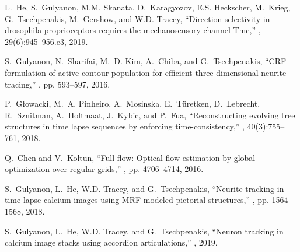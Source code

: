 \documentclass{article}
\begin{document}

\small{
%
\begin{thebibliography}{10}
	
	L.~He, S.~Gulyanon, M.M. Skanata, D.~Karagyozov, E.S. Heckscher, M.~Krieg,
	G.~Tsechpenakis, M.~Gershow, and W.D. Tracey,
	\newblock ``Direction selectivity in drosophila proprioceptors requires the
	mechanosensory channel {Tmc},''
	, 29(6):945--956.e3, 2019.
	
	
	S.~Gulyanon, N.~Sharifai, M.~D. Kim, A.~Chiba, and G.~Tsechpenakis,
	\newblock ``{CRF} formulation of active contour population for efficient three-dimensional neurite tracing,''
	, pp. 593--597, 2016.
	
	P.~{Głowacki}, M.~A. {Pinheiro}, A.~{Mosinska}, E.~{Türetken}, D.~{Lebrecht},
	R.~{Sznitman}, A.~{Holtmaat}, J.~{Kybic}, and P.~{Fua},
	\newblock ``Reconstructing evolving tree structures in time lapse sequences by
	enforcing time-consistency,''
	, 40(3):755--761, 2018.
	
	Q.~Chen and V.~Koltun,
	\newblock ``Full flow: Optical flow estimation by global optimization over
	regular grids,''
	, pp. 4706--4714, 2016.
	
	
	S.~Gulyanon, L.~He, W.D. Tracey, and G.~Tsechpenakis,
	\newblock ``Neurite tracking in time-lapse calcium images using {MRF}-modeled
	pictorial structures,''
	, pp. 1564--1568, 2018.
	
	S.~Gulyanon, L.~He, W.D. Tracey, and G.~Tsechpenakis,
	\newblock ``Neuron tracking in calcium image stacks using accordion
	articulations,''
	, 2019.
	

\end{thebibliography}}
\end{document}
